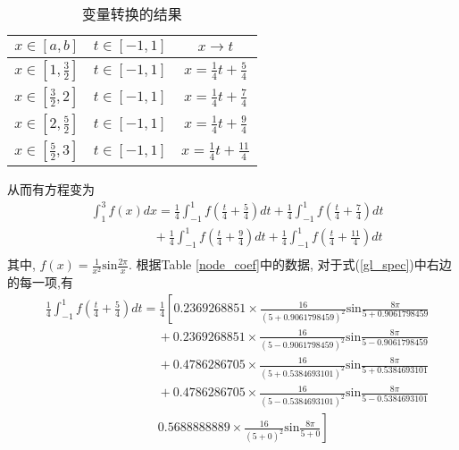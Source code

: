 \documentclass[a4paper]{article}
\begin{document}
\begin{spacing}{1.5}
\begin{CJK*}{GBK}{song}
\begin{table}[!htpb]
\begin{center}
\caption{变量转换的结果}
\begin{spacing}{1.5}
\begin{tabular}{ccc}
\toprule
$x\in[a, b]$ & $t\in[-1,1]$ & $x \rightarrow t$  \\
\midrule
$x\in[1, \frac{3}{2}]$ &  $t\in[-1, 1]$   & $x=\frac{1}{4}t + \frac{5}{4}$  \\
$x\in[\frac{3}{2}, 2]$ &  $t\in[-1, 1]$   & $x=\frac{1}{4}t + \frac{7}{4}$  \\
$x\in[2, \frac{5}{2}]$ &  $t\in[-1, 1]$   & $x=\frac{1}{4}t + \frac{9}{4}$   \\
$x\in[\frac{5}{2}, 3]$ &  $t\in[-1, 1]$   & $x=\frac{1}{4}t + \frac{11}{4}$  \\
\bottomrule
\end{tabular}
\end{spacing}
\end{center}
\end{table}
从而有方程变为
\begin{equation}\label{gl_spec}
\begin{split}
& \int_{1}^3 f(x)dx = \frac{1}{4}\int_{-1}^1 f\left(\frac{t}{4} + \frac{5}{4}\right)dt + \frac{1}{4}\int_{-1}^1 f\left(\frac{t}{4} +
 \frac{7}{4}\right)dt \\
 & \quad \quad  \quad \quad \quad + \frac{1}{4}\int_{-1}^1 f\left(\frac{t}{4} + \frac{9}{4}\right)dt + \frac{1}{4}\int_{-1}^1 f\left(\frac{t}{4} +\frac{11}{4}\right)dt\\ %
\end{split}
\end{equation}
其中, $f(x)=\frac{1}{x^2}\text{sin}\frac{2\pi}{x}$.
根据Table \ref{node_coef}中的数据, 对于式(\ref{gl_spec})中右边的每一项,有%
\begin{equation}
\begin{split}
& \frac{1}{4}\int_{-1}^1 f\left(\frac{t}{4} + \frac{5}{4}\right)dt = \frac{1}{4}\left[0.2369268851 \times \frac{16}{(5+0.9061798459)^2}\text{sin}\frac{8\pi}{5+0.9061798459}\right.\\
& \quad \quad  \quad \quad \quad  \quad \quad \quad  \quad+ 0.2369268851 \times \frac{16}{(5-0.9061798459 )^2}\text{sin}\frac{8\pi}{5-0.9061798459} \\
& \quad \quad  \quad \quad \quad  \quad  \quad \quad  \quad+0.4786286705 \times \frac{16}{(5+0.5384693101)^2}\text{sin}\frac{8\pi}{5+0.5384693101} \\
& \quad \quad  \quad \quad \quad  \quad \quad \quad  \quad+ 0.4786286705\times  \frac{16}{(5-0.5384693101)^2}\text{sin}\frac{8\pi}{5-0.5384693101} \\
&\quad \quad  \quad \quad \quad  \quad\quad \quad  \quad \left.0.5688888889\times \frac{16}{(5+0)^2}\text{sin}\frac{8\pi}{5+0}\right] \\
\end{split}
\end{equation}


\end{CJK*}
\end{spacing}
\end{document}
